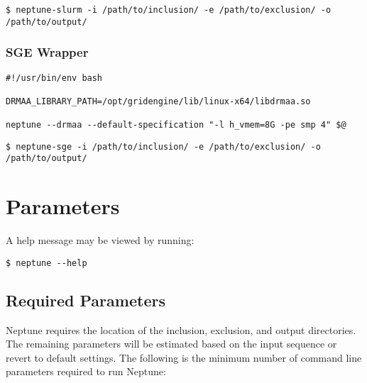 \documentclass[a4paper,10pt]{article}
\begin{document}
\begin{minipage}{\linewidth}
\begin{lstlisting}[frame=single, style=bash, title={Slurm Example}]
$ neptune-slurm -i /path/to/inclusion/ -e /path/to/exclusion/ -o /path/to/output/
\end{lstlisting}
\end{minipage}

\subsubsection{SGE Wrapper}

\begin{minipage}{\linewidth}
\begin{lstlisting}[frame=single, style=bash, title={neptune-sge}]
#!/usr/bin/env bash

DRMAA_LIBRARY_PATH=/opt/gridengine/lib/linux-x64/libdrmaa.so

neptune --drmaa --default-specification "-l h_vmem=8G -pe smp 4" $@
\end{lstlisting}
\end{minipage}

\begin{minipage}{\linewidth}
\begin{lstlisting}[frame=single, style=bash, title={SGE Example}]
$ neptune-sge -i /path/to/inclusion/ -e /path/to/exclusion/ -o /path/to/output/
\end{lstlisting}
\end{minipage}

\newpage
\section{Parameters}

A help message may be viewed by running:

\begin{minipage}{\linewidth}
\begin{lstlisting}[frame=single, style=bash]
$ neptune --help
\end{lstlisting}
\end{minipage}

\subsection{Required Parameters}

Neptune requires the location of the inclusion, exclusion, and output directories. The remaining parameters will be estimated based on the input sequence or revert to default settings. The following is the minimum number of command line parameters required to run Neptune:
\end{document}
